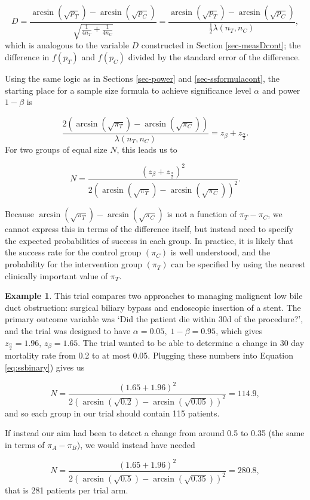 \documentclass[
  openany]{book}
\theoremstyle{definition}
\theoremstyle{definition}
\newtheorem{example}{Example}[chapter]
\theoremstyle{definition}
\theoremstyle{definition}
\theoremstyle{remark}
\begin{document}
\[
D =  \frac{\arcsin{\left(\sqrt{p_T}\right)} - \arcsin{\left(\sqrt{p_C}\right)}}{\sqrt{\frac{1}{4n_T} + \frac{1}{4n_C}}}=  \frac{\arcsin{\left(\sqrt{p_T}\right)} - \arcsin{\left(\sqrt{p_C}\right)}}{\frac{1}{2}\lambda\left(n_T,n_C\right)},
\]
which is analogous to the variable \(D\) constructed in Section \ref{sec-measDcont}; the difference in \(f\left(p_T\right)\) and \(f\left(p_C\right)\) divided by the standard error of the difference.

Using the same logic as in Sections \ref{sec-power} and \ref{sec-ssformulacont}, the starting place for a sample size formula to achieve significance level \(\alpha\) and power \(1-\beta\) is

\[
\frac{2\left(\arcsin{\left(\sqrt{\pi_T}\right)} - \arcsin{\left(\sqrt{\pi_C}\right)}\right)}{\lambda\left(n_T,n_C\right)} = z_\beta + z_{\frac{\alpha}{2}}.
\]
For two groups of equal size \(N\), this leads us to

\begin{equation}
N = \frac{\left(z_\beta + z_{\frac{\alpha}{2}}\right)^2}{2\left(\arcsin{\left(\sqrt{\pi_T}\right)} - \arcsin{\left(\sqrt{\pi_C}\right)}\right)^2}.
\label{eq:ssbinary}
\end{equation}

Because \(\arcsin{\left(\sqrt{\pi_T}\right)} - \arcsin{\left(\sqrt{\pi_C}\right)}\) is not a function of \(\pi_T - \pi_C\), we cannot express this in terms of the difference itself, but instead need to specify the expected probabilities of success in each group. In practice, it is likely that the success rate for the control group \(\left(\pi_C\right)\) is well understood, and the probability for the intervention group \(\left(\pi_T\right)\) can be specified by using the nearest clinically important value of \(\pi_T\).

\begin{example}
\protect\hypertarget{exm:samplesize1}{}\label{exm:samplesize1}\citep[From][]{smith1994randomised}
This trial compares two approaches to managing malignent low bile duct obstruction: surgical biliary bypass and endoscopic insertion of a stent. The primary outcome variable was `Did the patient die within 30d of the procedure?', and the trial was designed to have \(\alpha=0.05,\;1-\beta=0.95\), which gives \(z_{\frac{\alpha}{2}}=1.96,\,z_{\beta} = 1.65\). The trial wanted to be able to determine a change in 30 day mortality rate from 0.2 to at most 0.05. Plugging these numbers into Equation \eqref{eq:ssbinary}) gives us

\[ N = \frac{\left(1.65 + 1.96\right)^2}{2\left(\arcsin{\left(\sqrt{0.2}\right)} - \arcsin{\left(\sqrt{0.05}\right)}\right)^2} = 114.9, \]
and so each group in our trial should contain 115 patients.

If instead our aim had been to detect a change from around 0.5 to 0.35 (the same in terms of \(\pi_A - \pi_B\)), we would instead have needed

\[ N = \frac{\left(1.65 + 1.96\right)^2}{2\left(\arcsin{\left(\sqrt{0.5}\right)} - \arcsin{\left(\sqrt{0.35}\right)}\right)^2} = 280.8 ,\]
that is 281 patients per trial arm.
\end{example}
\end{document}
